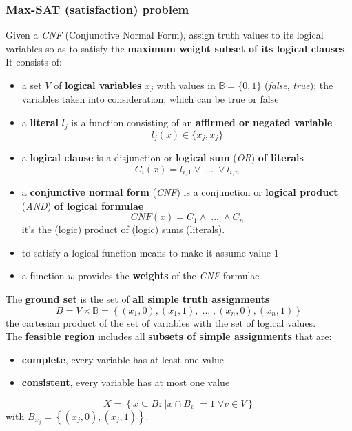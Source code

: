 \subsubsection{Max-SAT (satisfaction) problem}
Given a \textit{CNF} (Conjunctive Normal Form), assign truth values to its logical variables so as to satisfy the \textbf{maximum weight subset of its logical clauses}. It consists of: 
\begin{itemize}
	\item a set $V$ of \textbf{logical variables} $x_j$ with values in $\mathbb{B} = \{0, 1\}$ (\textit{false}, \textit{true}); the variables taken into consideration, which can be true or false
	\item a \textbf{literal} $l_j$ is a function consisting of an \textbf{affirmed or negated variable}
	$$ l_j (x) \in \{x_j, \overline{x}_j\}$$
	\item a \textbf{logical clause} is a disjunction or \textbf{logical sum} (\textit{OR}) \textbf{of literals}
	$$ C_i (x) = l_{i,1} \vee \; ... \; \vee l_{i,n}$$
	\item a \textbf{conjunctive normal form} (\textit{CNF}) is a conjunction or \textbf{logical product} (\textit{AND}) \textbf{of logical formulae}
	$$ CNF (x) = C_1 \wedge \; ... \; \wedge C_n $$
	it's the (logic) product of (logic) sums (literals).\\
	\item to satisfy a logical function means to make it assume value 1
	\item a function $w$ provides the \textbf{weights} of the \textit{CNF} formulae
\end{itemize}

The \textbf{ground set} is the set of \textbf{all simple truth assignments}
$$ B = V \times \mathbb{B} = \left\{(x_1, 0), (x_1, 1), \; ... \; , (x_n, 0), (x_n, 1)\right\}$$
the cartesian product of the set of variables with the set of logical values.\\

The \textbf{feasible region} includes all \textbf{subsets of simple assignments} that are:
\begin{itemize}
	\item \textbf{complete}, every variable has at least one value
	\item \textbf{consistent}, every variable has at most one value
\end{itemize}
$$ X = \left\{x \subseteq B : \, |x \cap B_v| = 1 \; \forall v \in V \right\}$$
with $B_{x_j} = \left\{(x_j, 0), (x_j, 1)\right\}$.\\

